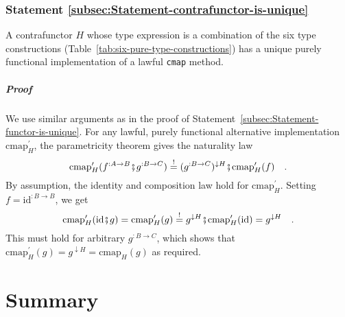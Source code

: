 \subsubsection{Statement \label{subsec:Statement-contrafunctor-is-unique}\ref{subsec:Statement-contrafunctor-is-unique}}

A contrafunctor $H$ whose type expression is a combination of the
six type constructions (Table~\ref{tab:six-pure-type-constructions})
has a unique purely functional implementation of a lawful \lstinline!cmap!
method. 

\subparagraph{Proof}

We use similar arguments as in the proof of Statement~\ref{subsec:Statement-functor-is-unique}.
For any lawful, purely functional alternative implementation $\text{cmap}_{H}^{\prime}$,
the parametricity theorem gives the naturality law
\[
\text{cmap}_{H}^{\prime}(f^{:A\rightarrow B}\bef g^{:B\rightarrow C})\overset{!}{=}(g^{:B\rightarrow C})^{\downarrow H}\bef\text{cmap}_{H}^{\prime}(f)\quad.
\]
By assumption, the identity and composition law hold for $\text{cmap}_{H}^{\prime}$.
Setting $f=\text{id}^{:B\rightarrow B}$, we get
\[
\text{cmap}_{H}^{\prime}(\text{id}\bef g)=\text{cmap}_{H}^{\prime}(g)\overset{!}{=}g^{\downarrow H}\bef\text{cmap}_{H}^{\prime}(\text{id})=g^{\downarrow H}\quad.
\]
This must hold for arbitrary $g^{:B\rightarrow C}$, which shows that
$\text{cmap}_{H}^{\prime}(g)=g^{\downarrow H}=\text{cmap}_{H}(g)$
as required.

\section{Summary}

